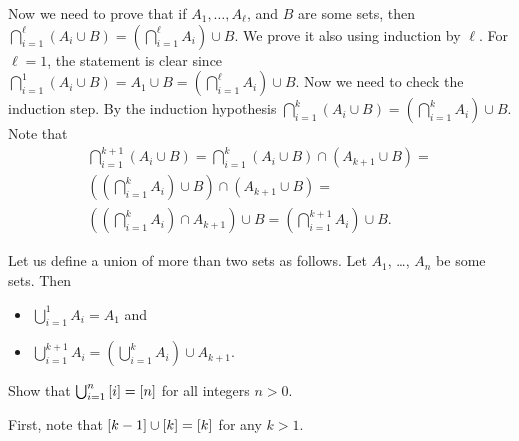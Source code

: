 \begin{chapterendexercises}
\begin{solution}
\begin{enumerate}
          Now we need to prove that if $A_1, \dots, A_\ell$, and $B$ are some sets,
          then $\bigcap_{i = 1}^\ell (A_i \cup B) =
          \left(\bigcap_{i = 1}^\ell A_i\right) \cup B$.
          We prove it also using induction by $\ell$. For $\ell = 1$, the
          statement is clear since $\bigcap_{i = 1}^1 (A_i \cup B) = A_1 \cup B
          = \left(\bigcap_{i = 1}^\ell A_i\right) \cup B$.
          Now we need to check the induction step. By the induction hypothesis
          $\bigcap_{i = 1}^k (A_i \cup B) =
            \left(\bigcap_{i = 1}^k A_i\right) \cup B$. Note that
          \begin{multline*}
            \bigcap_{i = 1}^{k + 1} (A_i \cup B) =
            \bigcap_{i = 1}^k (A_i \cup B) \cap (A_{k + 1} \cup B) = \\
            \left(\left(\bigcap_{i = 1}^k A_i\right) \cup B\right) \cap
              (A_{k + 1} \cup B) =  \\
            \left(
              \left(
                \bigcap_{i = 1}^k A_i
              \right) \cap A_{k + 1} 
            \right) \cup B =
            \left(\bigcap_{i = 1}^{k + 1} A_i\right) \cup B.
          \end{multline*}
      \end{enumerate}
    \end{solution}
  \exercise Let us define a union of more than two sets as follows.
      Let $A_1$, \dots, $A_n$ be some sets. Then
      \begin{itemize}
        \item $\bigcup_{i = 1}^1 A_i = A_1$ and
        \item $\bigcup_{i = 1}^{k + 1} A_i =
          \left( \bigcup_{i = 1}^k A_i \right) \cup A_{k + 1}$.
      \end{itemize}

      Show that $\bigcup_{i = 1}^n {[{i}]} = {[{n}]}$ for all integers 
      $n > 0$.
      \begin{solution}
        First, note that ${[{k - 1}]} \cup {[{k}]} = {[{k}]}$ for any 
        $k > 1$.


\end{solution}
\end{chapterendexercises}
